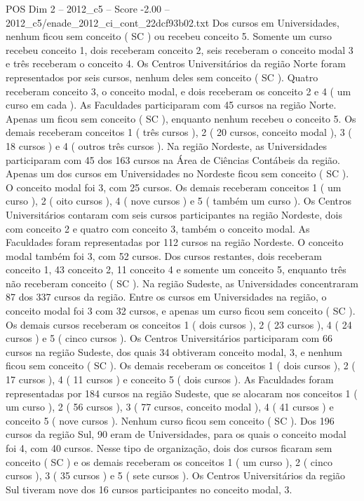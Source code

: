 \begin{textsample}{POS Dim 2 – 2012\_c5 – Score -2.00 – 2012\_c5/enade\_2012\_ci\_cont\_22dcf93b02.txt}
Dos cursos em Universidades, nenhum ficou sem conceito ( SC ) ou recebeu conceito 5.
Somente um curso recebeu conceito 1, dois receberam conceito 2, seis receberam o conceito modal 3 e três receberam o conceito 4.
Os Centros Universitários da região Norte foram representados por seis cursos, nenhum deles sem conceito ( SC ).
Quatro receberam conceito 3, o conceito modal, e dois receberam os conceito 2 e 4 ( um curso em cada ).
As Faculdades participaram com 45 cursos na região Norte.
Apenas um ficou sem conceito ( SC ), enquanto nenhum recebeu o conceito 5.
Os demais receberam conceitos 1 ( três cursos ), 2 ( 20 cursos, conceito modal ), 3 ( 18 cursos ) e 4 ( outros três cursos ).
Na região Nordeste, as Universidades participaram com 45 dos 163 cursos na Área de Ciências Contábeis da região.
Apenas um dos cursos em Universidades no Nordeste ficou sem conceito ( SC ).
O conceito modal foi 3, com 25 cursos.
Os demais receberam conceitos 1 ( um curso ), 2 ( oito cursos ), 4 ( nove cursos ) e 5 ( também um curso ).
Os Centros Universitários contaram com seis cursos participantes na região Nordeste, dois com conceito 2 e quatro com conceito 3, também o conceito modal.
As Faculdades foram representadas por 112 cursos na região Nordeste.
O conceito modal também foi 3, com 52 cursos.
Dos cursos restantes, dois receberam conceito 1, 43 conceito 2, 11 conceito 4 e somente um conceito 5, enquanto três não receberam conceito ( SC ).
Na região Sudeste, as Universidades concentraram 87 dos 337 cursos da região.
Entre os cursos em Universidades na região, o conceito modal foi 3 com 32 cursos, e apenas um curso ficou sem conceito ( SC ).
Os demais cursos receberam os conceitos 1 ( dois cursos ), 2 ( 23 cursos ), 4 ( 24 cursos ) e 5 ( cinco cursos ).
Os Centros Universitários participaram com 66 cursos na região Sudeste, dos quais 34 obtiveram conceito modal, 3, e nenhum ficou sem conceito ( SC ).
Os demais receberam os conceitos 1 ( dois cursos ), 2 ( 17 cursos ), 4 ( 11 cursos ) e conceito 5 ( dois cursos ).
As Faculdades foram representadas por 184 cursos na região Sudeste, que se alocaram nos conceitos 1 ( um curso ), 2 ( 56 cursos ), 3 ( 77 cursos, conceito modal ), 4 ( 41 cursos ) e conceito 5 ( nove cursos ).
Nenhum curso ficou sem conceito ( SC ).
Dos 196 cursos da região Sul, 90 eram de Universidades, para os quais o conceito modal foi 4, com 40 cursos.
Nesse tipo de organização, dois dos cursos ficaram sem conceito ( SC ) e os demais receberam os conceitos 1 ( um curso ), 2 ( cinco cursos ), 3 ( 35 cursos ) e 5 ( sete cursos ).
Os Centros Universitários da região Sul tiveram nove dos 16 cursos participantes no conceito modal, 3.

\end{textsample}
